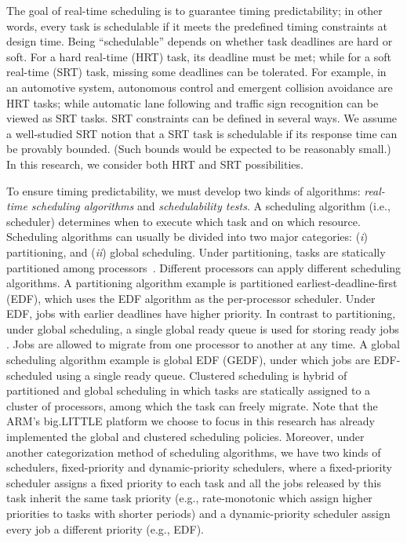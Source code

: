 The goal of real-time scheduling is to guarantee timing predictability; in other words, every task is schedulable if it meets the predefined timing constraints at design time. Being ``schedulable'' depends on whether task deadlines are hard or soft. %
For a hard real-time (HRT) task, its deadline must be met; while for a soft real-time (SRT) task, missing some deadlines can be tolerated. For example, in an automotive system, autonomous control and emergent collision avoidance  are  HRT tasks; while automatic lane following and traffic sign recognition can be viewed as SRT tasks. SRT constraints can be defined in several ways. We assume a well-studied SRT notion \cite{mills2010stochastic, erickson2012soft, johndissertation, BBBdissertation, devidissertation, leontyevdissertation} that a SRT task is schedulable if its response time can be provably bounded. (Such bounds would be expected to be reasonably small.) In this research, we consider both HRT and SRT possibilities.  

To ensure timing predictability, we must develop two kinds of algorithms: \textit{real-time scheduling algorithms} and \textit{schedulability tests}. A scheduling algorithm (i.e., scheduler) determines when to execute which task and on which resource. Scheduling algorithms can usually be divided into two major categories: (\textit{i}) partitioning, and (\textit{ii}) global scheduling. %
Under partitioning, tasks are statically partitioned among processors~\cite{andersson2003, baker2007, funk2005, Baruah2006a, chattopadhyay2011, baruah2005a}. %
Different processors can apply different scheduling algorithms. A partitioning algorithm example is partitioned earliest-deadline-first (EDF), which uses the EDF algorithm as the per-processor scheduler. Under EDF, jobs with earlier deadlines have higher priority. In contrast to partitioning, under global scheduling, a single global ready queue is used for storing ready jobs \cite{baruah2008, bertogna2011b, BC, devi2005}. Jobs are allowed to migrate from one processor to another at any time. A global scheduling algorithm example is global EDF (GEDF), under which jobs are EDF-scheduled using a single ready queue. 
 Clustered scheduling is hybrid of partitioned and global scheduling in which tasks are statically assigned to a cluster of processors, among which the task can freely migrate.
 Note that the ARM's big.LITTLE platform we choose to focus in this research has already implemented the global and clustered scheduling policies. Moreover, under another categorization method of scheduling algorithms, we have two kinds of schedulers, fixed-priority and dynamic-priority schedulers, where a fixed-priority scheduler assigns a fixed priority to each task and all the jobs released by this task inherit the same task priority (e.g., rate-monotonic which assign higher priorities to tasks with shorter periods) and a dynamic-priority scheduler assign every job a different priority (e.g., EDF).
 
